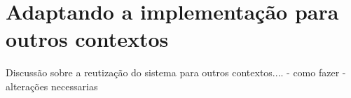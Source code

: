 \section[Adaptando a implementação para outros contextos]{Adaptando a implementação para outros contextos}
Discussão sobre a reutização do sistema para outros contextos....
- como fazer
- alterações necessarias